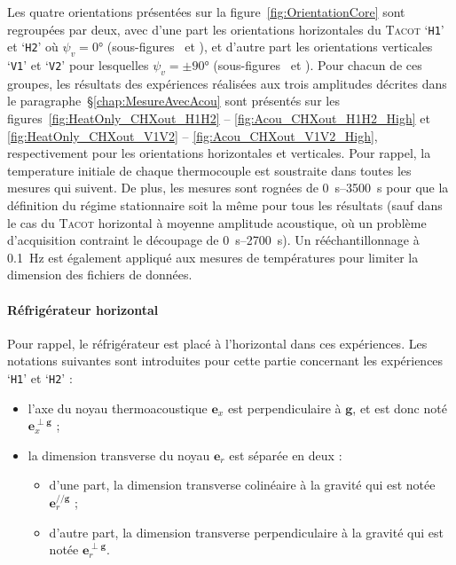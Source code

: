 Les quatre orientations présentées sur la figure~\ref{fig:OrientationCore} sont regroupées par deux, avec d'une part les orientations horizontales du \textsc{Tacot} `\texttt{H1}' et `\texttt{H2}' où $\psi_v=\ang{0}$ (sous-figures~ et ), et d'autre part les orientations verticales `\texttt{V1}' et `\texttt{V2}' pour lesquelles $\psi_v=\pm\ang{90}$ (sous-figures~ et ). Pour chacun de ces groupes, les résultats des expériences réalisées aux trois amplitudes décrites dans le paragraphe~§\ref{chap:MesureAvecAcou} sont présentés sur les figures~\ref{fig:HeatOnly_CHXout_H1H2} -- \ref{fig:Acou_CHXout_H1H2_High} et \ref{fig:HeatOnly_CHXout_V1V2} -- \ref{fig:Acou_CHXout_V1V2_High}, respectivement pour les orientations horizontales et verticales. Pour rappel, la temperature initiale de chaque thermocouple est soustraite dans toutes les mesures qui suivent. De plus, les mesures sont rognées de \qtyrange{0}{3500}{\second} pour que la définition du régime stationnaire soit la même pour tous les résultats (sauf dans le cas du \textsc{Tacot} horizontal à moyenne amplitude acoustique, où un problème d'acquisition contraint le découpage de \qtyrange{0}{2700}{\second}). Un rééchantillonnage à \qty{.1}{\hertz} est également appliqué aux mesures de températures pour limiter la dimension des fichiers de données.

\paragraph{Réfrigérateur horizontal}
Pour rappel, le réfrigérateur est placé à l'horizontal dans ces expériences. Les notations suivantes sont introduites pour cette partie concernant les expériences `\texttt{H1}' et `\texttt{H2}' :

\begin{itemize}
\item l'axe du noyau thermoacoustique $\mathbf e_x$ est perpendiculaire à $\mathbf g$, et est donc noté $\mathbf e_x^{\perp \mathbf g}$ ;
\item la dimension transverse du noyau $\mathbf e_r$ est séparée en deux :
	\begin{itemize}
	\item d'une part, la dimension transverse colinéaire à la gravité qui est notée $\mathbf e_r^{// \mathbf g}$ ;
	\item d'autre part, la dimension transverse perpendiculaire à la gravité qui est notée $\mathbf e_r^{\perp \mathbf g}$.
	\end{itemize}
\end{itemize}

